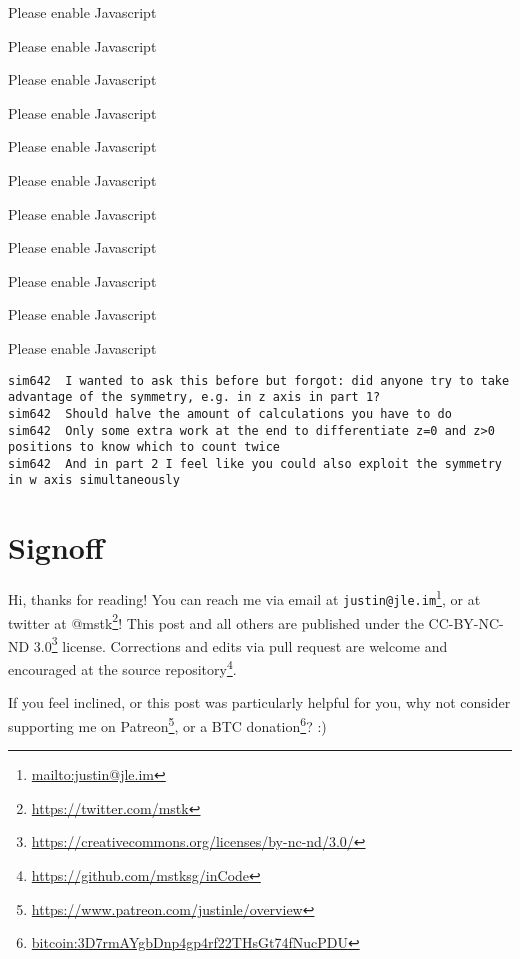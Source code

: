 \documentclass[]{article}
\renewcommand{\href}[2]{#2\footnote{\url{#1}}}
\begin{document}
\leavevmode\hypertarget{golDrawer}{}%
Please enable Javascript

\leavevmode\hypertarget{gol3D}{}%
Please enable Javascript

\leavevmode\hypertarget{gol4D}{}%
Please enable Javascript

\leavevmode\hypertarget{golFlat}{}%
Please enable Javascript

\leavevmode\hypertarget{golSyms3DForward}{}%
Please enable Javascript

\leavevmode\hypertarget{golSyms3DReverse}{}%
Please enable Javascript

\leavevmode\hypertarget{golSyms4DForward}{}%
Please enable Javascript

\leavevmode\hypertarget{golSyms4DReverse}{}%
Please enable Javascript

\leavevmode\hypertarget{golTreeForward}{}%
Please enable Javascript

\leavevmode\hypertarget{golTreeReverse}{}%
Please enable Javascript

\leavevmode\hypertarget{golSyms5D}{}%
Please enable Javascript

\begin{verbatim}
sim642  I wanted to ask this before but forgot: did anyone try to take advantage of the symmetry, e.g. in z axis in part 1?
sim642  Should halve the amount of calculations you have to do
sim642  Only some extra work at the end to differentiate z=0 and z>0 positions to know which to count twice
sim642  And in part 2 I feel like you could also exploit the symmetry in w axis simultaneously
\end{verbatim}

\hypertarget{signoff}{%
\section{Signoff}\label{signoff}}

Hi, thanks for reading! You can reach me via email at
\href{mailto:justin@jle.im}{\nolinkurl{justin@jle.im}}, or at twitter at
\href{https://twitter.com/mstk}{@mstk}! This post and all others are published
under the \href{https://creativecommons.org/licenses/by-nc-nd/3.0/}{CC-BY-NC-ND
3.0} license. Corrections and edits via pull request are welcome and encouraged
at \href{https://github.com/mstksg/inCode}{the source repository}.

If you feel inclined, or this post was particularly helpful for you, why not
consider \href{https://www.patreon.com/justinle/overview}{supporting me on
Patreon}, or a \href{bitcoin:3D7rmAYgbDnp4gp4rf22THsGt74fNucPDU}{BTC donation}?
:)
\end{document}
